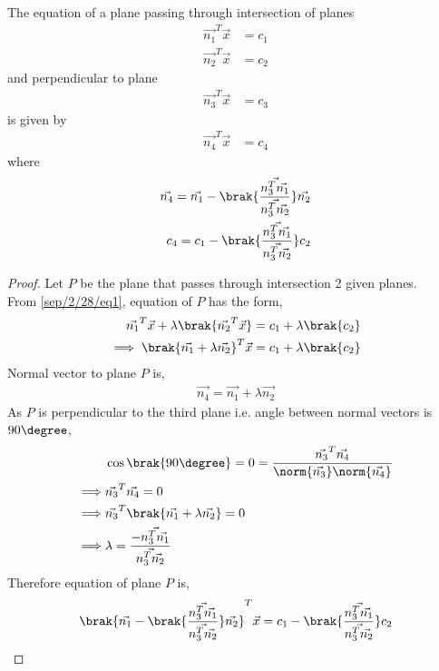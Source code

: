 \begin{lemma}
   The equation of a plane passing through intersection of planes
   \begin{align}
    \vec{n_{1}}^T\vec{x}&=c_{1}\\ \vec{n_{2}}^T\vec{x}&=c_{2}
   \end{align}
   and perpendicular to plane
   \begin{align}
     \vec{n_{3}}^T\vec{x}&=c_{3}
   \end{align}
   is given by 
   \begin{align}
      \vec{n_{4}}^T\vec{x}&=c_{4}
   \end{align}
   where 
   \begin{align}
       \vec{n_{4}} = \vec{n_{1}} - \brak{\frac{\vec{n_{3}^T\vec{n_1}}}{\vec{n_{3}^T\vec{n_2}}}}\vec{n_2}\\
       c_{4} = c_{1} - \brak{\frac{\vec{n_{3}^T\vec{n_1}}}{\vec{n_{3}^T\vec{n_2}}}}c_{2}
   \end{align}
\end{lemma}
\begin{proof}
   Let $P$ be the plane that passes through intersection 2 given planes.\\  From \eqref{sep/2/28/eq1}, equation of $P$ has the form,
   \begin{align}
       \vec{n_{1}}^T\vec{x} + \lambda\brak{\vec{n_{2}}^T\vec{x}} = c_{1} + \lambda\brak{c_{2}}\\
       \implies \brak{\vec{n_{1}}+\lambda\vec{n_{2}}}^T\vec{x} = c_{1} + \lambda\brak{c_{2}}
   \end{align}
  Normal vector to plane $P$ is,
 \begin{align}
     \vec{n_{4}} = \vec{n_{1}}+\lambda\vec{n_{2}}
 \end{align}
 As $P$ is perpendicular to the third plane i.e. angle between normal vectors is $90\degree$, 
 \begin{align}
     &\cos\brak{90\degree} = 0 = \dfrac{\vec{n_{3}}^T\vec{n_{4}}}{\norm{\vec{n_{3}}}\norm{\vec{n_{4}}}}\\
    \implies &\vec{n_{3}}^T\vec{n_{4}} = 0\\
    \implies &\vec{n_{3}}^T\brak{\vec{n_{1}}+\lambda\vec{n_{2}}} = 0\\
    \implies &\lambda = \frac{-\vec{n_{3}^T\vec{n_1}}}{\vec{n_{3}^T\vec{n_2}}}
 \end{align}
 Therefore equation of plane $P$ is,
 \begin{align}
     \brak{\vec{n_{1}} - \brak{\frac{\vec{n_{3}^T\vec{n_1}}}{\vec{n_{3}^T\vec{n_2}}}}\vec{n_2}}^T\vec{x} = c_{1} - \brak{\frac{\vec{n_{3}^T\vec{n_1}}}{\vec{n_{3}^T\vec{n_2}}}}c_{2}
 \end{align}
\end{proof}
